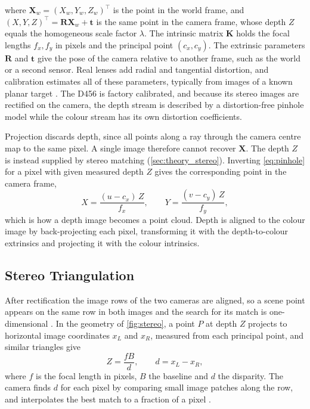 where $\mathbf{X}_w=(X_w,Y_w,Z_w)^\top$ is the point in the world frame, and $(X,Y,Z)^\top=\mathbf{R}\mathbf{X}_w+\mathbf{t}$ is the same point in the camera frame, whose depth $Z$ equals the homogeneous scale factor $\lambda$. The intrinsic matrix $\mathbf{K}$ holds the focal lengths $f_x, f_y$ in pixels and the principal point $(c_x, c_y)$. The extrinsic parameters $\mathbf{R}$ and $\mathbf{t}$ give the pose of the camera relative to another frame, such as the world or a second sensor. Real lenses add radial and tangential distortion, and calibration estimates all of these parameters, typically from images of a known planar target \cite{zhangFlexibleNewTechnique2000}. The D456 is factory calibrated, and because its stereo images are rectified on the camera, the depth stream is described by a distortion-free pinhole model while the colour stream has its own distortion coefficients.

Projection discards depth, since all points along a ray through the camera centre map to the same pixel. A single image therefore cannot recover $\mathbf{X}$. The depth $Z$ is instead supplied by stereo matching (\autoref{sec:theory_stereo}). Inverting \autoref{eq:pinhole} for a pixel with given measured depth $Z$ gives the corresponding point in the camera frame,
\begin{equation}
X=\frac{(u-c_x)\,Z}{f_x},\qquad Y=\frac{(v-c_y)\,Z}{f_y},
\label{eq:backproject}
\end{equation}
which is how a depth image becomes a point cloud. Depth is aligned to the colour image by back-projecting each pixel, transforming it with the depth-to-colour extrinsics and projecting it with the colour intrinsics.

\subsection{Stereo Triangulation}
\label{sec:theory_stereo}
After rectification the image rows of the two cameras are aligned, so a scene point appears on the same row in both images and the search for its match is one-dimensional \cite{hartley2003multiple}. In the geometry of \autoref{fig:stereo}, a point $P$ at depth $Z$ projects to horizontal image coordinates $x_L$ and $x_R$, measured from each principal point, and similar triangles give
\begin{equation}
Z=\frac{fB}{d},\qquad d=x_L-x_R,
\label{eq:depth}
\end{equation}
where $f$ is the focal length in pixels, $B$ the baseline and $d$ the \gls{disparity}. The camera finds $d$ for each pixel by comparing small image patches along the row, and interpolates the best match to a fraction of a pixel \cite{keselmanIntelRRealSenseTMStereoscopic2017}.

